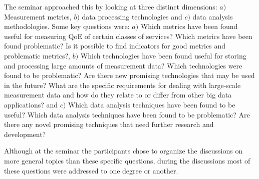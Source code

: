 The seminar approached this by looking at three distinct dimensions: $a)$
Measurement metrics, $b)$ data processing technologies and $c)$ data analysis
methodologies. Some key questions were: $a)$ Which metrics have been found
useful for measuring \ac{QoE} of certain classes of services?  Which metrics
have been found problematic? Is it possible to find indicators for good
metrics and problematic metrics?, $b)$ Which technologies have been found
useful for storing and processing large amounts of measurement data?  Which
technologies were found to be problematic?  Are there new promising
technologies that may be used in the future? What are the specific
requirements for dealing with large-scale measurement data and how do they
relate to or differ from other big data applications? and $c)$ Which data
analysis techniques have been found to be useful? Which data analysis
techniques have been found to be problematic? Are there any novel promising
techniques that need further research and development?

Although at the seminar the participants chose to organize the discussions on
more general topics than these specific questions, during the discussions most
of these questions were addressed to one degree or another.
